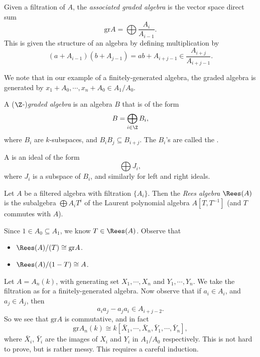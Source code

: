 \documentclass[a4paper]{article}
\renewcommand\Gr{\mathrm{gr}}
\begin{document}
\begin{defi}
  Given a filtration of $A$, the \emph{associated graded algebra} is the vector space direct sum
  \[
    \Gr A = \bigoplus \frac{A_i}{A_{i - 1}}.
  \]
  This is given the structure of an algebra by defining multiplication by
  \[
    (a + A_{i - 1}) (b + A_{j - 1}) = ab + A_{i + j - 1} \in \frac{A_{i + j}}{A_{i + j - 1}}.
  \]
\end{defi}
We note that in our example of a finitely-generated algebra, the graded algebra is generated by $x_1 + A_0, \cdots, x_n + A_0 \in A_1/A_0$.

\begin{defi}
  A ($\Z$-)\emph{graded algebra} is an algebra $B$ that is of the form
  \[
    B = \bigoplus_{i \in \Z} B_i,
  \]
  where $B_i$ are $k$-subspaces, and $B_i B_j \subseteq B_{i + j}$. The $B_i$'s are called the .

  A  is an ideal of the form
  \[
    \bigoplus J_i,
  \]
  where $J_i$ is a subspace of $B_i$, and similarly for left and right ideals.
\end{defi}

\begin{defi}
  Let $A$ be a filtered algebra with filtration $\{A_i\}$. Then the \emph{Rees algebra} $\Rees(A)$ is the subalgebra $\bigoplus A_i T^i$ of the Laurent polynomial algebra $A[T, T^{-1}]$ (and $T$ commutes with $A$).
\end{defi}

Since $1 \in A_0 \subseteq A_1$, we know $T \in \Rees(A)$. Observe that
\begin{itemize}
  \item $\Rees(A)/(T) \cong \Gr A$.
  \item $\Rees(A)/(1 - T) \cong A$.
\end{itemize}

\begin{eg}
  Let $A = A_n(k)$, with generating set $X_1, \cdots, X_n$ and $Y_1, \cdots, Y_n$. We take the filtration as for a finitely-generated algebra. Now observe that if $a_i \in A_i$, and $a_j \in A_j$, then
  \[
    a_i a_j - a_j a_i \in A_{i + j - 2}.
  \]
  So we see that $\Gr A$ is commutative, and in fact
  \[
    \Gr A_n(k) \cong k[\bar{X}_1, \cdots, \bar{X}_n, \bar{Y}_1, \cdots, \bar{Y}_n],
  \]
  where $\bar{X}_i$, $\bar{Y}_i$ are the images of $X_i$ and $Y_i$ in $A_1/A_0$ respectively. This is not hard to prove, but is rather messy. This requires a careful induction.
\end{eg}
\end{document}
